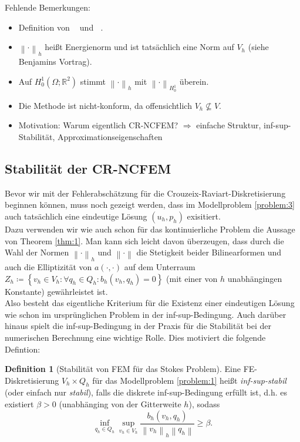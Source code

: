 \message{ !name(script.tex)}\documentclass[a4paper]{scrartcl}
\newcommand{\real}{\mathbb{R}}
\newcommand{\Hzero}{H_0^1}
\newcommand{\norm}[1]{\left\lVert#1\right\rVert}
\newcommand{\hnorm}[1]{\left\lVert#1\right\rVert_h}
\newcommand{\set}[1]{\left\{#1\right\}}
\DeclareMathOperator{\divh}{div_h}
\DeclareMathOperator{\nablah}{\nabla_{\textit{h}}}
\theoremstyle{plain}
\theoremstyle{definition}
\newtheorem{definition}{Definition}
\theoremstyle{remark}
\begin{document}
{\color{red}
\noindent Fehlende Bemerkungen: 
\begin{itemize}
\item Definition von \(\nablah\) und \(\divh\).
\item \(\hnorm{\cdot}\) heißt Energienorm und ist tatsächlich eine
  Norm auf \(V_h\) (siehe Benjamins Vortrag).
\item Auf \(\Hzero(\Omega; \real^2)\) stimmt \(\hnorm{\cdot}\) mit
  \(\norm{\cdot}_{\Hzero}\) überein.
\item Die Methode ist nicht-konform, da offensichtlich \(V_h
  \not\subseteq V\).
\item Motivation: Warum eigentlich CR-NCFEM? \(\Rightarrow\) einfache Struktur,
  inf-sup-Stabilität, Approximationseigenschaften
\end{itemize}
}



\subsection{Stabilität der CR-NCFEM}
\label{sec:stabilitat-der-cr}

Bevor wir mit der Fehlerabschätzung für die
Crouzeix-Raviart-Diskretisierung beginnen können, muss noch gezeigt
werden, dass im Modellproblem \ref{problem:3} auch tatsächlich eine
eindeutige Lösung \((u_h,p_h)\) exisitiert. \\

\noindent Dazu verwenden wir wie auch schon für das kontinuierliche Problem die
Aussage von Theorem \ref{thm:1}. Man kann sich leicht davon
überzeugen, dass durch die Wahl der Normen \(\hnorm{\cdot}\) und
\(\norm{\cdot}\) die Stetigkeit beider Bilinearformen und auch die
Elliptizität von \(a(\cdot, \cdot)\) auf dem Unterraum \(Z_h \coloneqq
\set{v_h \in V_h\colon \forall q_h \in Q_h\colon b_h(v_h, q_h) = 0}\)
(mit einer von \(h\) unabhängingen Konstante) gewährleistet ist. \\

\noindent Also besteht das eigentliche Kriterium für die Existenz
einer eindeutigen Lösung wie schon im ursprünglichen Problem in der
inf-sup-Bedingung. Auch darüber hinaus spielt die inf-sup-Bedingung
in der Praxis für die Stabilität bei der numerischen Berechnung eine
wichtige Rolle. Dies motiviert die folgende Defintion: 

\begin{definition}[Stabilität von FEM für das Stokes Problem] \label{def:1}
  Eine FE-Diskretisierung \(V_h\times Q_h\) für das Modellproblem
  \ref{problem:1} heißt \emph{inf-sup-stabil} (oder einfach nur
  \emph{stabil}), falls die diskrete inf-sup-Bedingung erfüllt ist,
  d.h. es existiert \(\beta > 0\) (unabhänging von der Gitterweite
  \(h\)), sodass 
  \begin{equation}
    \label{eq:14}
    \inf_{q_h \in Q_h} \sup_{v_h \in V_h} \frac{b_h(v_h, q_h)}{\hnorm{v_h} \norm{q_h}} \geq \beta. 
  \end{equation}
  \end{definition}
\end{document}
